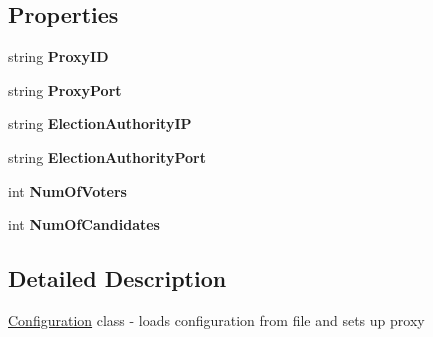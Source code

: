 \subsection*{Properties}
\begin{DoxyCompactItemize}
\item 
\hypertarget{class_proxy_1_1_configuration_a9e411a9040314277c5c2958552195f8c}{}string {\bfseries Proxy\+I\+D}\label{class_proxy_1_1_configuration_a9e411a9040314277c5c2958552195f8c}

\item 
\hypertarget{class_proxy_1_1_configuration_ae2147da4f45f0c42354fb2502be1362e}{}string {\bfseries Proxy\+Port}\label{class_proxy_1_1_configuration_ae2147da4f45f0c42354fb2502be1362e}

\item 
\hypertarget{class_proxy_1_1_configuration_af7a6394df716315fb9de7545ac2ca15b}{}string {\bfseries Election\+Authority\+I\+P}\label{class_proxy_1_1_configuration_af7a6394df716315fb9de7545ac2ca15b}

\item 
\hypertarget{class_proxy_1_1_configuration_aa40fb0df156408efd864d9c64b763b34}{}string {\bfseries Election\+Authority\+Port}\label{class_proxy_1_1_configuration_aa40fb0df156408efd864d9c64b763b34}

\item 
\hypertarget{class_proxy_1_1_configuration_a7005b1c3b0aa30f01c428aa6ddb3c0fd}{}int {\bfseries Num\+Of\+Voters}\label{class_proxy_1_1_configuration_a7005b1c3b0aa30f01c428aa6ddb3c0fd}

\item 
\hypertarget{class_proxy_1_1_configuration_a65a9662a20300903cc0d56a7914e1274}{}int {\bfseries Num\+Of\+Candidates}\label{class_proxy_1_1_configuration_a65a9662a20300903cc0d56a7914e1274}

\end{DoxyCompactItemize}


\subsection{Detailed Description}
\hyperlink{class_proxy_1_1_configuration}{Configuration} class -\/ loads configuration from file and sets up proxy 



